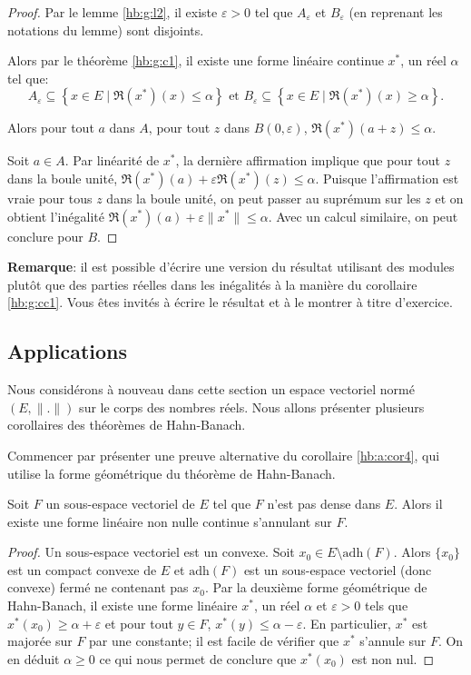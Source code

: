 \begin{proof}
  Par le lemme \ref{hb:g:l2}, il existe $\varepsilon > 0$ tel que $A_\varepsilon$
  et $B_\varepsilon$ (en reprenant les notations du lemme) sont disjoints.

  Alors par le théorème \ref{hb:g:c1}, il existe une forme linéaire continue $x^*$,
  un réel $\alpha$ tel que:
  $$A_\varepsilon\subseteq \left\{x\in E\mid \Re(x^*)(x) \leq \alpha\right\} \mbox{ et }
  B_\varepsilon \subseteq \left\{x\in E\mid \Re(x^*)(x) \geq \alpha\right\}. $$

  Alors pour tout $a$ dans $A$, pour tout $z$ dans $B(0, \varepsilon)$,
  $\Re(x^*)(a + z) \leq \alpha$.

  Soit $a\in A$. Par linéarité de $x^*$, la dernière affirmation implique
  que pour tout $z$ dans la boule unité,
  $\Re(x^*)(a) + \varepsilon\Re(x^*)(z) \leq \alpha$.
  Puisque l'affirmation est vraie
  pour tous $z$ dans la boule unité, on peut
  passer au suprémum sur les $z$ et on obtient l'inégalité $\Re(x^*)(a)+
  \varepsilon \|x^*\|\leq \alpha$.
  Avec un calcul similaire, on peut conclure pour $B$.
\end{proof}

\textbf{Remarque}: il est possible d'écrire une version du résultat
utilisant des modules plutôt que des parties réelles dans les inégalités
à la manière du corollaire \ref{hb:g:cc1}. Vous êtes invités à écrire
le résultat et à le montrer à titre d'exercice.

\subsection{Applications}
Nous considérons à nouveau dans cette section un espace vectoriel
normé $(E, \|.\|)$ sur le corps des nombres réels. Nous allons
présenter plusieurs corollaires des théorèmes de Hahn-Banach.

Commencer par présenter une preuve alternative du corollaire \ref{hb:a:cor4},
qui utilise la forme géométrique du théorème de Hahn-Banach.
\begin{cor}
  Soit $F$ un sous-espace vectoriel de $E$ tel que $F$ n'est
  pas dense dans $E$. Alors il existe une forme linéaire non nulle
  continue s'annulant sur $F$.
\end{cor}
\begin{proof}
  Un sous-espace vectoriel est un convexe. Soit $x_0\in E\setminus\mathrm{adh}(F)$.
  Alors $\{x_0\}$ est un compact convexe de $E$ et $\mathrm{adh}(F)$
  est un sous-espace vectoriel (donc convexe) fermé ne contenant pas $x_0$.
  Par la deuxième forme géométrique de Hahn-Banach, il existe une forme
  linéaire $x^*$, un réel $\alpha$ et $\varepsilon >0$
  tels que $x^*(x_0)\geq \alpha + \varepsilon$  et
  pour tout $y\in F$, $x^*(y)\leq \alpha-\varepsilon$. En particulier, $x^*$ est majorée
  sur $F$ par une constante; il est facile de vérifier que $x^*$ s'annule
  sur $F$. On en déduit $\alpha \geq 0$ ce qui nous permet de conclure
  que $x^*(x_0)$ est non nul.
\end{proof}

